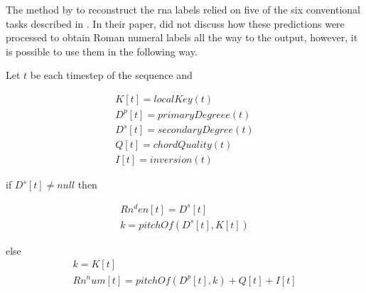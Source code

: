 
The method by \textcite{chen2018functional} to reconstruct
the \gls{rna} labels relied on five of the six conventional
tasks described in . In their
paper, \textcite{chen2018functional} did not discuss how
these predictions were processed to obtain Roman numeral
labels all the way to the output, however, it is possible to
use them in the following way.

Let $t$ be each timestep of the sequence and

\begin{equation}
\begin{split}
K[t] = localKey(t) \\
D^p[t] = primaryDegree e(t) \\
D^s[t] = secondaryDegree(t)  \\
Q[t] = chordQuality(t) \\
I[t] = inversion(t)
\end{split}
\end{equation}

if $D^s[t] \neq null$ then

\begin{equation}
\begin{split}
Rn^den[t] = D^s[t] \\
k = pitchOf(D^s[t], K[t])
\end{split}
\end{equation}

else
\begin{equation}
\begin{split}
k = K[t] \\
Rn^num[t] = pitchOf(D^p[t], k) + Q[t] + I[t] 
\end{split}
\end{equation}

